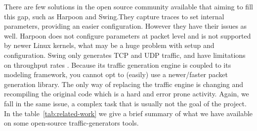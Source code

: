 There are few solutions in the open source community available that aiming to fill this gap, such as Harpoon\cite{harpoon-paper} and Swing\cite{swing-paper}.They capture traces to set internal parameters, providing an easier configuration. However they have their issues as well. Harpoon does not configure parameters at packet level\cite{harpoon-paper} and is not supported by newer Linux kernels, what may be a huge problem with setup and configuration. Swing\cite{swing-paper} only generates TCP and UDP traffic, and have limitations on throughput rates\cite{swing-paper} \cite{legotg-paper}. Because its traffic generation engine is coupled to its modeling framework, you cannot opt to (easily) use a newer/faster packet generation library. The only way of replacing the traffic engine is changing and recompiling the original code which is a hard and  error prone activity\cite{legotg-paper}. Again, we fall in the same issue, a complex task that is usually not the goal of the project. In the table~\ref{tab:related-work} we give a brief summary of what we have available on some open-source traffic-generators tools. 




